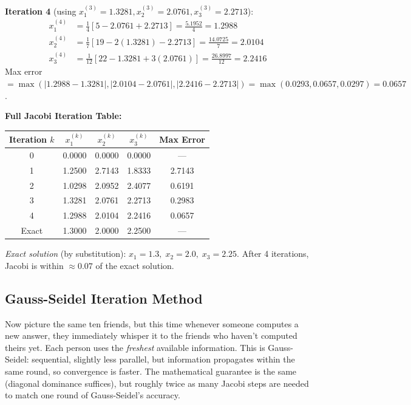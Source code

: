 \documentclass[12pt,a4paper]{article}
\begin{document}
\textbf{Iteration 4} (using \(x_1^{(3)}=1.3281, x_2^{(3)}=2.0761, x_3^{(3)}=2.2713\)):
\begin{align*}
x_1^{(4)} &= \tfrac{1}{4}[5 - 2.0761 + 2.2713] = \tfrac{5.1952}{4} = 1.2988 \\
x_2^{(4)} &= \tfrac{1}{7}[19 - 2(1.3281) - 2.2713] = \tfrac{14.0725}{7} = 2.0104 \\
x_3^{(4)} &= \tfrac{1}{12}[22 - 1.3281 + 3(2.0761)] = \tfrac{26.8997}{12} = 2.2416
\end{align*}
Max error \(= \max(|1.2988-1.3281|,|2.0104-2.0761|,|2.2416-2.2713|)
= \max(0.0293, 0.0657, 0.0297) = 0.0657\).

\textbf{Full Jacobi Iteration Table:}

\begin{center}
\begin{tabular}{@{}ccccc@{}}
\toprule
Iteration \(k\) & \(x_1^{(k)}\) & \(x_2^{(k)}\) & \(x_3^{(k)}\) & Max Error \\
\midrule
0 & 0.0000 & 0.0000 & 0.0000 & --- \\
1 & 1.2500 & 2.7143 & 1.8333 & 2.7143 \\
2 & 1.0298 & 2.0952 & 2.4077 & 0.6191 \\
3 & 1.3281 & 2.0761 & 2.2713 & 0.2983 \\
4 & 1.2988 & 2.0104 & 2.2416 & 0.0657 \\
Exact & 1.3000 & 2.0000 & 2.2500 & --- \\
\bottomrule
\end{tabular}
\end{center}

\textit{Exact solution} (by substitution): \(x_1=1.3,\; x_2=2.0,\; x_3=2.25\).
After 4 iterations, Jacobi is within \(\approx 0.07\) of the exact solution.

\subsection{Gauss-Seidel Iteration Method}

Now picture the same ten friends, but this time whenever someone computes a new answer,
they immediately whisper it to the friends who haven't computed theirs yet. Each person
uses the \emph{freshest} available information. This is Gauss-Seidel: sequential, slightly
less parallel, but information propagates within the same round, so convergence is faster.
The mathematical guarantee is the same (diagonal dominance suffices), but roughly twice
as many Jacobi steps are needed to match one round of Gauss-Seidel's accuracy.
\end{document}
